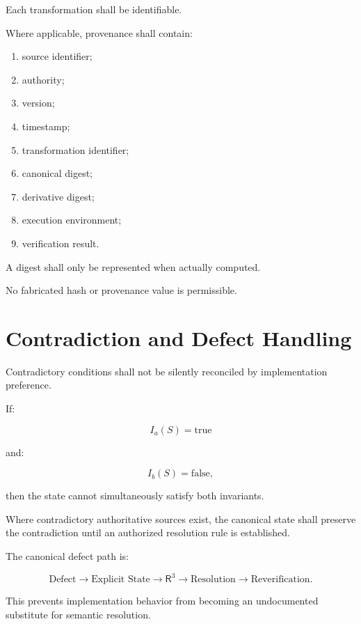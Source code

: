 \documentclass[11pt]{article}
\newcommand{\Rthree}{\ensuremath{\mathsf{R}^{3}}}
\begin{document}
Each transformation shall be identifiable.

Where applicable, provenance shall contain:

\begin{enumerate}
    \item source identifier;
    \item authority;
    \item version;
    \item timestamp;
    \item transformation identifier;
    \item canonical digest;
    \item derivative digest;
    \item execution environment;
    \item verification result.
\end{enumerate}

A digest shall only be represented when actually computed.

No fabricated hash or provenance value is permissible.

\section{Contradiction and Defect Handling}

Contradictory conditions shall not be silently reconciled by
implementation preference.

If:

\[
I_a(S)=\mathrm{true}
\]

and:

\[
I_b(S)=\mathrm{false},
\]

then the state cannot simultaneously satisfy both invariants.

Where contradictory authoritative sources exist, the canonical
state shall preserve the contradiction until an authorized
resolution rule is established.

The canonical defect path is:

\[
\boxed{
\text{Defect}
\rightarrow
\text{Explicit State}
\rightarrow
\Rthree{}
\rightarrow
\text{Resolution}
\rightarrow
\text{Reverification}.
}
\]

This prevents implementation behavior from becoming an
undocumented substitute for semantic resolution.

\end{document}
